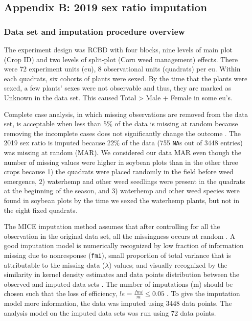 \documentclass[
]{article}
\begin{document}
\hypertarget{appendix-b-2019-sex-ratio-imputation}{%
\subsection*{Appendix B: 2019 sex ratio imputation}\label{appendix-b-2019-sex-ratio-imputation}}

\hypertarget{data-set-and-imputation-procedure-overview}{%
\subsubsection*{Data set and imputation procedure overview}\label{data-set-and-imputation-procedure-overview}}

The experiment design was RCBD with four blocks, nine levels of main plot (Crop ID) and two levels of split-plot (Corn weed management) effects. There were 72 experiment units (eu), 8 observational units (quadrats) per eu. Within each quadrats, six cohorts of plants were sexed. By the time that the plants were sexed, a few plants' sexes were not observable and thus, they are marked as Unknown in the data set. This caused Total \textgreater{} Male + Female in some eu's.

Complete case analysis, in which missing observations are removed from the data set, is acceptable when less than 5\% of the data is missing at random because removing the incomplete cases does not significantly change the outcome \citep{azurMultipleImputationChained2011}. The 2019 sex ratio is imputed because 22\% of the data (755 \texttt{NA}s out of 3448 entries) was missing at random (MAR). We considered our data MAR even though the number of missing values were higher in soybean plots than in the other three crops because 1) the quadrats were placed randomly in the field before weed emergence, 2) waterhemp and other weed seedlings were present in the quadrats at the beginning of the season, and 3) waterhemp and other weed species were found in soybean plots by the time we sexed the waterhemp plants, but not in the eight fixed quadrats.

The MICE imputation method assumes that after controlling for all the observation in the original data set, all the missingness occurs at random \citep{vanbuurenMiceMultivariateImputation2011}. A good imputation model is numerically recognized by low fraction of information missing due to nonresponse (\texttt{fmi}), small proportion of total variance that is attributable to the missing data (\(\lambda\)) values; and visually recognized by the similarity in kernel density estimates and data points distribution between the observed and imputed data sets \citep{vanbuurenMiceMultivariateImputation2011}. The number of imputations (m) should be chosen such that the loss of efficiency, \(le = \frac{fmi}{m} \leq 0.05\) \citep{whiteMultipleImputationUsing2011}. To give the imputation model more information, the data was imputed using 3448 data points. The analysis model on the imputed data sets was run using 72 data points.
\end{document}
